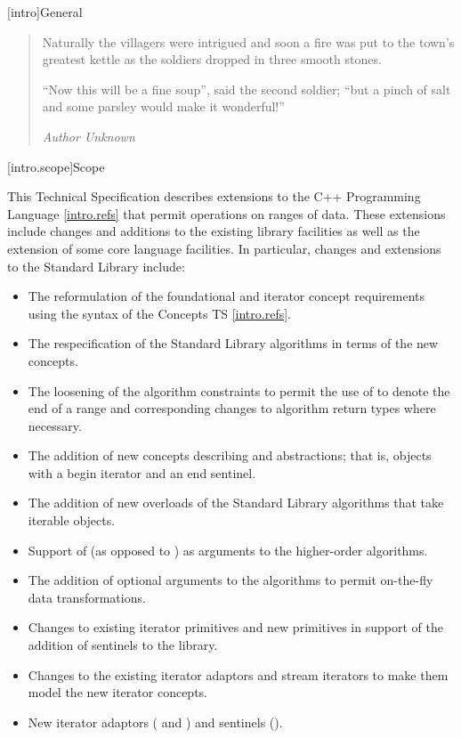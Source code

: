 [intro]{General}

\begin{quote}
Naturally the villagers were intrigued and soon a fire was put to the town's greatest
kettle as the soldiers dropped in three smooth stones.

``Now this will be a fine soup'', said the second soldier;
``but a pinch of salt and some parsley would make it wonderful!''
\begin{flushright}
\textemdash \textit{Author Unknown}
\end{flushright}
\end{quote}

[intro.scope]{Scope}

\pnum
This Technical Specification describes extensions to the C++
Programming Language \ref{intro.refs} that
permit operations on ranges of data. These extensions include
changes and additions to the existing library facilities as well
as the extension of some core language facilities. In particular,
changes and extensions to the Standard Library include:

\begin{itemize}
\item The reformulation of the foundational and iterator concept requirements
using the syntax of the Concepts TS \ref{intro.refs}.
\item The respecification of the Standard Library algorithms in terms of the new
concepts.
\item The loosening of the algorithm constraints to permit the use of
 to denote the end of a range and corresponding changes to algorithm
return types where necessary.
\item The addition of new concepts describing  and 
abstractions; that is, objects with a begin iterator and an end sentinel.
\item The addition of new overloads of the Standard Library algorithms that take iterable
objects.
\item Support of  (as opposed to ) as
arguments to the higher-order algorithms.
\item The addition of optional  arguments to the algorithms to
permit on-the-fly data transformations.
\item Changes to existing iterator primitives and new primitives in support of the
addition of sentinels to the library.
\item Changes to the existing iterator adaptors and stream iterators to make them model
the new iterator concepts.
\item New iterator adaptors ( and ) and
sentinels ().
\end{itemize}

